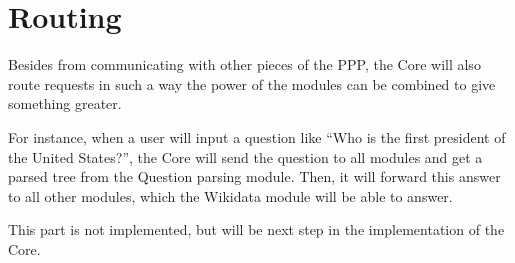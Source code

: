 \section{Routing}

Besides from communicating with other pieces of the PPP, the Core will
also route requests in such a way the power of the modules can be
combined to give something greater.

For instance, when a user will input a question like “Who is the first
president of the United States?”, the Core will send the question to
all modules and get a parsed tree from the Question parsing module. Then, it will forward this answer to all other modules, which the
Wikidata module will be able to answer.

This part is not implemented, but will be next step in the implementation
of the Core.
